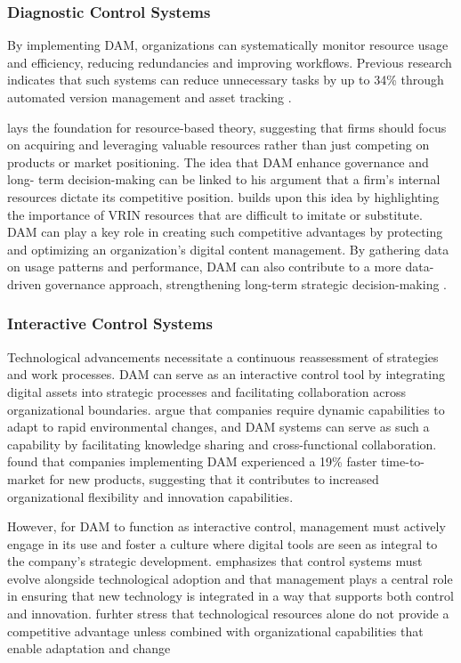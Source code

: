 \documentclass[a4paper,12pt,twocolumn]{article}
\begin{document}
\subsubsection{Diagnostic Control Systems}
By implementing DAM, organizations can systematically monitor resource usage and efficiency, reducing redundancies 
and improving workflows. Previous research indicates that such systems can reduce unnecessary tasks by up to 34\% through automated version management 
and asset tracking \cite{Mladenova2024}. 

\vspace{0.3cm}
\cite{wernerfelt1984} lays the foundation for resource-based theory, suggesting that firms should focus on acquiring and leveraging valuable resources 
rather than just competing on products or market positioning. The idea that DAM enhance governance and long-
term decision-making can be linked to his argument that a firm’s internal resources
dictate its competitive position. \cite{barney1991} builds upon this idea by highlighting the importance of VRIN resources that are difficult to imitate or substitute. 
DAM can play a key role in creating such competitive advantages by protecting and optimizing an organization’s digital content management. 
By gathering data on usage patterns and performance, DAM can also contribute to a more data-driven governance approach, strengthening long-term strategic decision-making \cite{wernerfelt1984}.

\subsubsection{Interactive Control Systems}
Technological advancements necessitate a continuous reassessment of strategies and work processes. DAM can serve as an interactive control 
tool by integrating digital assets into strategic processes and facilitating collaboration across organizational boundaries.
\cite{teece1997} argue that companies require dynamic capabilities 
to adapt to rapid environmental changes, and DAM systems can serve as such a capability by facilitating knowledge sharing and cross-functional collaboration.
\cite{Mladenova2024} found that companies implementing DAM experienced a 19\% faster time-to-market for new products, 
suggesting that it contributes to increased organizational flexibility and innovation capabilities.

\vspace{0.3cm}
However, for DAM to function as interactive control, management must actively engage in its use and foster a culture where digital 
tools are seen as integral to the company’s strategic development. 
\cite{simons1995} emphasizes that control systems must evolve alongside technological adoption and that management plays a central 
role in ensuring that new technology is integrated in a way that supports both control and innovation. 
 \cite{eisenhardt2000} furhter stress that technological resources alone do not provide a competitive advantage
 unless combined with organizational capabilities that enable adaptation and change
\end{document}

